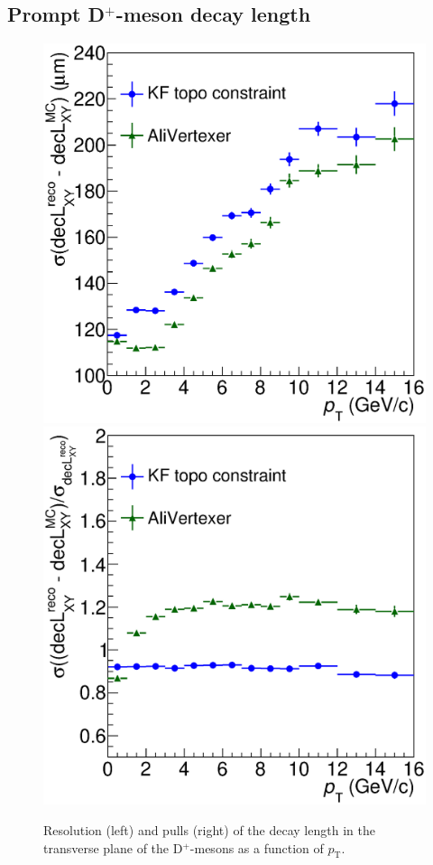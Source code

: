 \documentclass[b5paper,10pt,twoside,oldstyle,classica]{toptesi}
\newcommand{\pt}{p_\text{T}}
\begin{document}
\subsection{Prompt D$^+$-meson decay length}
\begin{figure}[b]
\begin{center}
{\includegraphics[scale = 0.28]{ResDecL.eps}}
\hspace{0.cm}
{\includegraphics[scale = 0.28]{PullsDecL.eps}}
\caption{Resolution (left) and pulls (right) of the decay length in the transverse plane of the D$^+$-mesons as a function of $\pt$.}
\label{KF_decL}
\end{center}
\end{figure} 
\end{document}
